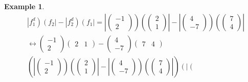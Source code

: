 \documentclass[aps,preprint]{revtex4}
\newtheorem{example}[theorem]{Example}
\begin{document}
\begin{example}
\begin{align}
& \left\vert f_{1}^{d}\right) \left( f_{2}\right\vert -\left\vert
f_{2}^{d}\right) \left( f_{1}\right\vert =\left\vert \left( 
\begin{array}{c}
-1 \\ 
2%
\end{array}%
\right) \right) \left( \left( 
\begin{array}{c}
2 \\ 
1%
\end{array}%
\right) \right\vert -\left\vert \left( 
\begin{array}{c}
4 \\ 
-7%
\end{array}%
\right) \right) \left( \left( 
\begin{array}{c}
7 \\ 
4%
\end{array}%
\right) \right\vert \\
& \leftrightarrow \left( 
\begin{array}{c}
-1 \\ 
2%
\end{array}%
\right) \left( 
\begin{array}{cc}
2 & 1%
\end{array}%
\right) -\left( 
\begin{array}{c}
4 \\ 
-7%
\end{array}%
\right) \left( 
\begin{array}{cc}
7 & 4%
\end{array}%
\right) \\
& \left( \left\vert \left( 
\begin{array}{c}
-1 \\ 
2%
\end{array}%
\right) \right) \left( \left( 
\begin{array}{c}
2 \\ 
1%
\end{array}%
\right) \right\vert -\left\vert \left( 
\begin{array}{c}
4 \\ 
-7%
\end{array}%
\right) \right) \left( \left( 
\begin{array}{c}
7 \\ 
4%
\end{array}%
\right) \right\vert \right) \left( \left\vert \left( 
\begin{array}{c}

\end{array}
\end{align}
\end{example}
\end{document}
